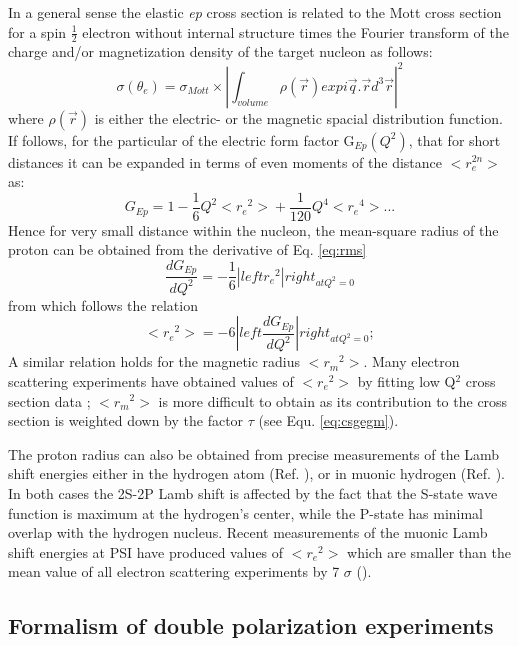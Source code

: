 In a general sense the elastic {\it {ep}}  cross section is related to the Mott cross section for a spin $\frac{1}{2}$ electron
without internal structure times the Fourier transform of the charge and/or magnetization density of the target nucleon as follows:
\begin{equation}
\sigma(\theta_e)=\sigma_{Mott}\times\left|\int_{volume}\rho(\vec r)exp{i\vec{q}.\vec r}d^3\vec r\right|^2
\end{equation}    
\noindent where $\rho(\vec r)$ is either the electric- or the magnetic spacial distribution function. If follows, for the particular of 
the electric form factor G$_{Ep}(Q^2)$, that for short distances it can be expanded in terms of even moments of the distance $<r_e^{2n}>$ as:
\begin{equation}
G_{Ep}=1 - \frac{1}{6}{Q^2<r_e{^2}>} + \frac{1}{120}{Q^4<r_e{^4}>} ... 
\label{eq:rms}
\end{equation}
\noindent Hence for very small distance within the nucleon, the mean-square radius of the proton can be obtained from the derivative of
 Eq. \ref{eq:rms} 
\begin{equation}
\frac{dG_{Ep}}{dQ^2}=-\frac{1}{6}|left{r_e{^2}}|right_{at Q^2=0}
\end{equation}
\noindent from which follows the relation 
\begin{equation}
<r_e{^2}> = - 6|left\frac{dG_{Ep}}{dQ^2}|right_{at Q^2=0}; 
\end{equation}
A similar relation holds for the magnetic radius $<r_m{^2}>$.
Many electron scattering experiments have obtained values of $<r_e{^2}>$ by fitting low Q$^2$ cross section data \cite{sick:2003,sick:2014} ; 
$<r_m{^2}>$ is more difficult to obtain as its contribution to the cross section is weighted down by the factor $\tau$ (see Equ. \ref{eq:csgegm}). 

The proton radius can also be obtained from precise measurements of the Lamb shift energies either in the hydrogen atom 
(Ref. \cite{melnikov:2000}), or in muonic hydrogen (Ref. \cite{antognini:2013}). 
In both cases the 2S-2P Lamb shift is affected by the fact that the S-state wave function is maximum at the hydrogen's center,
 while the P-state has minimal overlap with the hydrogen nucleus. Recent measurements of the muonic Lamb shift energies at PSI have produced
values of $<r_e{^2}>$ which are smaller than the mean value of all electron scattering experiments by 7 $\sigma$ (\cite{pohl:2013}).  


\subsection{Formalism of double polarization experiments}

